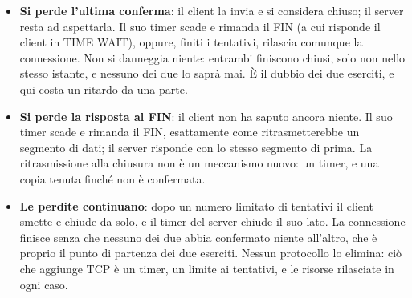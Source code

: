 \begin{itemize}
    \item \textbf{Si perde l'ultima conferma}: il client la invia e si considera chiuso; il server resta ad aspettarla. Il suo
          timer scade e rimanda il FIN (a cui risponde il client in TIME WAIT), oppure, finiti i tentativi, rilascia comunque
          la connessione. Non si danneggia niente: entrambi finiscono chiusi, solo non nello stesso istante, e nessuno dei
          due lo saprà mai. È il dubbio dei due eserciti, e qui costa un ritardo da una parte.
    \item \textbf{Si perde la risposta al FIN}: il client non ha saputo ancora niente. Il suo timer scade e rimanda il FIN,
          esattamente come ritrasmetterebbe un segmento di dati; il server risponde con lo stesso segmento di prima. La
          ritrasmissione alla chiusura non è un meccanismo nuovo: un timer, e una copia tenuta finché non è confermata.
    \item \textbf{Le perdite continuano}: dopo un numero limitato di tentativi il client smette e chiude da solo, e il timer
          del server chiude il suo lato. La connessione finisce senza che nessuno dei due abbia confermato niente all'altro,
          che è proprio il punto di partenza dei due eserciti. Nessun protocollo lo elimina: ciò che aggiunge TCP è un timer,
          un limite ai tentativi, e le risorse rilasciate in ogni caso.
\end{itemize}


